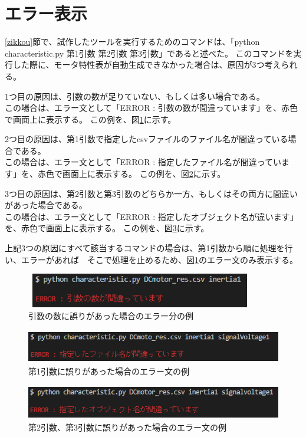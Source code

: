 \section{エラー表示}\label{error}
\ref{zikkou}節で、試作したツールを実行するためのコマンドは、「python characteristic.py 第1引数 第2引数 第3引数」であると述べた。
このコマンドを実行した際に、モータ特性表が自動生成できなかった場合は、原因が3つ考えられる。

1つ目の原因は、引数の数が足りていない、もしくは多い場合である。\\
この場合は、エラー文として「ERROR : 引数の数が間違っています」を、赤色で画面上に表示する。
この例を、図\ref{fig:error_hikisuu}に示す。

2つ目の原因は、第1引数で指定したcsvファイルのファイル名が間違っている場合である。\\
この場合は、エラー文として「ERROR : 指定したファイル名が間違っています」を、赤色で画面上に表示する。
この例を、図\ref{fig:error_file}に示す。

3つ目の原因は、第2引数と第3引数のどちらか一方、もしくはその両方に間違いがあった場合である。\\
この場合は、エラー文として「ERROR : 指定したオブジェクト名が違います」を、赤色で画面上に表示する。
この例を、図\ref{fig:error_comand}に示す。

上記3つの原因にすべて該当するコマンドの場合は、第1引数から順に処理を行い、エラーがあれば　そこで処理を止めるため、図\ref{fig:error_hikisuu}のエラー文のみ表示する。

\begin{figure}[t]
	\centering
	\includegraphics[width=10cm,height=1.5cm]{./Image/error_tarinai.png}
	\caption{引数の数に誤りがあった場合のエラー分の例}
	\label{fig:error_hikisuu}
\end{figure}

\begin{figure}[t]
	\centering
	\includegraphics[width=12cm,height=1.5cm]{./Image/error_file.png}
	\caption{第1引数に誤りがあった場合のエラー文の例}
	\label{fig:error_file}
\end{figure}

\begin{figure}[t]
	\centering
	\includegraphics[width=12cm,height=1.5cm]{./Image/error_comand.png}
	\caption{第2引数、第3引数に誤りがあった場合のエラー文の例}
	\label{fig:error_comand}
\end{figure}